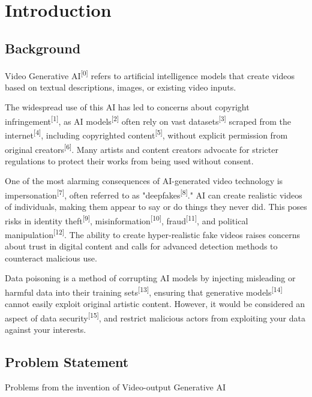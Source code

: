 \chapter{Introduction}
\label{chap:introduction}

\section{Background}
\label{section:background}

Video Generative AI\textsuperscript{[0]} refers to artificial intelligence models that create videos based on textual descriptions, images, or existing video inputs. 

The widespread use of this AI has led to concerns about copyright infringement\textsuperscript{[1]}, as AI models\textsuperscript{[2]} often rely on vast datasets\textsuperscript{[3]} scraped from the internet\textsuperscript{[4]}, including copyrighted content\textsuperscript{[5]}, without explicit permission from original creators\textsuperscript{[6]}. Many artists and content creators advocate for stricter regulations to protect their works from being used without consent.

One of the most alarming consequences of AI-generated video technology is impersonation\textsuperscript{[7]}, often referred to as "deepfakes\textsuperscript{[8]}." AI can create realistic videos of individuals, making them appear to say or do things they never did. This poses risks in identity theft\textsuperscript{[9]}, misinformation\textsuperscript{[10]}, fraud\textsuperscript{[11]}, and political manipulation\textsuperscript{[12]}. The ability to create hyper-realistic fake videos raises concerns about trust in digital content and calls for advanced detection methods to counteract malicious use.

Data poisoning is a method of corrupting AI models by injecting misleading or harmful data into their training sets\textsuperscript{[13]}, ensuring that generative models\textsuperscript{[14]} cannot easily exploit original artistic content. However, it would be considered an aspect of data security\textsuperscript{[15]}, and restrict malicious actors from exploiting your data against your interests.

\section{Problem Statement}
\label{section:problem-statement}

Problems from the invention of Video-output Generative AI

